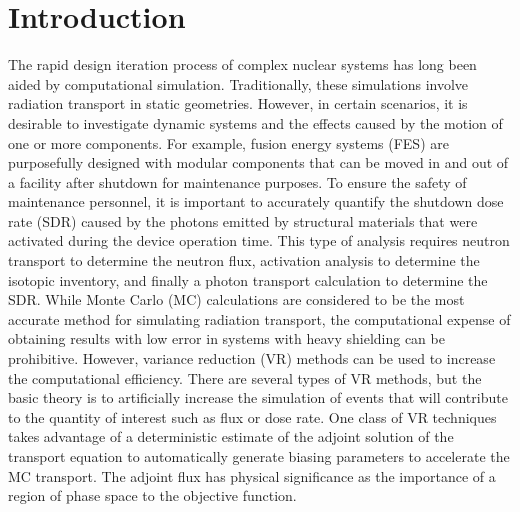 
\chapter{Introduction} \label{ch:intro}

The rapid design iteration process of complex nuclear systems has long been
aided by computational simulation.  Traditionally, these simulations
involve radiation transport in static geometries.  However, in certain
scenarios, it is desirable to investigate dynamic systems and the effects caused
by the motion of one or more components.  
For example, fusion energy systems (FES) are purposefully designed with modular components that can be moved in and
out of a facility after shutdown for maintenance purposes.  
To ensure the safety of maintenance personnel, it is important to accurately quantify the
shutdown dose rate (SDR) caused by the photons emitted by structural materials that were
activated during the device operation time.  
This type of analysis requires neutron transport to determine the neutron flux,
activation analysis to determine the isotopic inventory, and finally a 
photon transport calculation to determine the SDR.
While Monte Carlo (MC) calculations are considered to be the most accurate method for simulating
radiation transport, the computational expense of obtaining results with low
error 
in systems with heavy shielding can be prohibitive.  
However, variance reduction (VR)
methods can be used to increase the computational efficiency.  
There are several types
of VR methods, but the basic theory is to artificially increase the simulation of
events that will contribute to the quantity of interest such as flux or dose
rate. 
 One class of VR techniques takes advantage of a deterministic estimate of the adjoint 
solution of the transport equation to automatically
generate biasing parameters to accelerate the MC transport. 
The adjoint flux has physical significance as the importance of a region of
phase space to the objective function.

